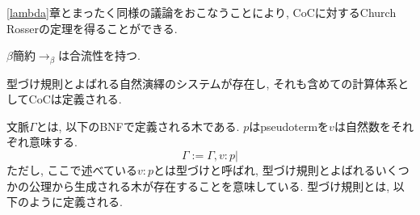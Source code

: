 \documentclass{ltjsarticle}
\begin{document}
\ref{lambda}章とまったく同様の議論をおこなうことにより, CoCに対するChurch Rosserの定理を得ることができる.

\begin{thm}
 $\beta$簡約$\rightarrow_{\beta}$は合流性を持つ.
\end{thm}

型づけ規則とよばれる自然演繹のシステムが存在し, それも含めての計算体系としてCoCは定義される.

\begin{defn}
 文脈$\Gamma$とは, 以下のBNFで定義される木である. $p$はpseudotermを$v$は自然数をそれぞれ意味する.
 \[
 \Gamma := \Gamma, v : p |
 \]
 ただし, ここで述べている$v : p$とは型づけと呼ばれ, 型づけ規則とよばれるいくつかの公理から生成される木が存在することを意味している. 型づけ規則とは, 以下のように定義される.
 

\end{defn}
\end{document}

